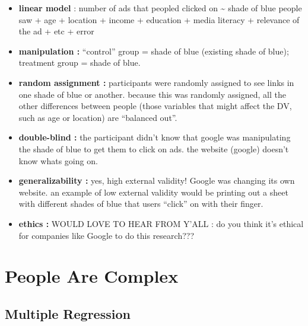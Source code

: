 \documentclass[
  letterpaper,
  DIV=11,
  numbers=noendperiod,
  oneside]{scrreprt}
\begin{document}
\begin{tcolorbox}[enhanced jigsaw, toptitle=1mm, toprule=.15mm, rightrule=.15mm, breakable, left=2mm, colbacktitle=quarto-callout-tip-color!10!white, colback=white, opacityback=0, coltitle=black, bottomtitle=1mm, opacitybacktitle=0.6, titlerule=0mm, leftrule=.75mm, arc=.35mm, bottomrule=.15mm, title=\textcolor{quarto-callout-tip-color}{\faLightbulb}\hspace{0.5em}{Answers to Google Shade of Blue Experiment}, colframe=quarto-callout-tip-color-frame]

\begin{itemize}
\item
  \textbf{linear model} : number of ads that peopled clicked on
  \textasciitilde{} shade of blue people saw + age + location + income +
  education + media literacy + relevance of the ad + etc + error
\item
  \textbf{manipulation :} ``control'' group = shade of blue (existing
  shade of blue); treatment group = shade of blue.
\item
  \textbf{random assignment :} participants were randomly assigned to
  see links in one shade of blue or another. because this was randomly
  assigned, all the other differences between people (those variables
  that might affect the DV, such as age or location) are ``balanced
  out''.
\item
  \textbf{double-blind :} the participant didn't know that google was
  manipulating the shade of blue to get them to click on ads. the
  website (google) doesn't know whats going on.
\item
  \textbf{generalizability :} yes, high external validity! Google was
  changing its own website. an example of low external validity would be
  printing out a sheet with different shades of blue that users
  ``click'' on with their finger.
\item
  \textbf{ethics :} WOULD LOVE TO HEAR FROM Y'ALL : do you think it's
  ethical for companies like Google to do this research???
\end{itemize}

\end{tcolorbox}

\part{People Are Complex}

\chapter{Multiple Regression}\label{multiple-regression}
\end{document}
